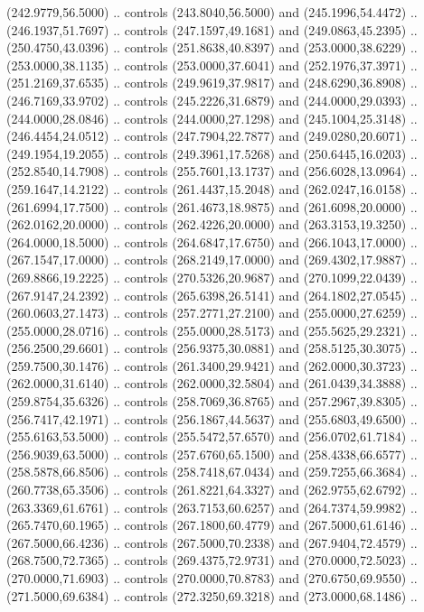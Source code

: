   (242.9779,56.5000) .. controls (243.8040,56.5000) and (245.1996,54.4472) ..
  (246.1937,51.7697) .. controls (247.1597,49.1681) and (249.0863,45.2395) ..
  (250.4750,43.0396) .. controls (251.8638,40.8397) and (253.0000,38.6229) ..
  (253.0000,38.1135) .. controls (253.0000,37.6041) and (252.1976,37.3971) ..
  (251.2169,37.6535) .. controls (249.9619,37.9817) and (248.6290,36.8908) ..
  (246.7169,33.9702) .. controls (245.2226,31.6879) and (244.0000,29.0393) ..
  (244.0000,28.0846) .. controls (244.0000,27.1298) and (245.1004,25.3148) ..
  (246.4454,24.0512) .. controls (247.7904,22.7877) and (249.0280,20.6071) ..
  (249.1954,19.2055) .. controls (249.3961,17.5268) and (250.6445,16.0203) ..
  (252.8540,14.7908) .. controls (255.7601,13.1737) and (256.6028,13.0964) ..
  (259.1647,14.2122) .. controls (261.4437,15.2048) and (262.0247,16.0158) ..
  (261.6994,17.7500) .. controls (261.4673,18.9875) and (261.6098,20.0000) ..
  (262.0162,20.0000) .. controls (262.4226,20.0000) and (263.3153,19.3250) ..
  (264.0000,18.5000) .. controls (264.6847,17.6750) and (266.1043,17.0000) ..
  (267.1547,17.0000) .. controls (268.2149,17.0000) and (269.4302,17.9887) ..
  (269.8866,19.2225) .. controls (270.5326,20.9687) and (270.1099,22.0439) ..
  (267.9147,24.2392) .. controls (265.6398,26.5141) and (264.1802,27.0545) ..
  (260.0603,27.1473) .. controls (257.2771,27.2100) and (255.0000,27.6259) ..
  (255.0000,28.0716) .. controls (255.0000,28.5173) and (255.5625,29.2321) ..
  (256.2500,29.6601) .. controls (256.9375,30.0881) and (258.5125,30.3075) ..
  (259.7500,30.1476) .. controls (261.3400,29.9421) and (262.0000,30.3723) ..
  (262.0000,31.6140) .. controls (262.0000,32.5804) and (261.0439,34.3888) ..
  (259.8754,35.6326) .. controls (258.7069,36.8765) and (257.2967,39.8305) ..
  (256.7417,42.1971) .. controls (256.1867,44.5637) and (255.6803,49.6500) ..
  (255.6163,53.5000) .. controls (255.5472,57.6570) and (256.0702,61.7184) ..
  (256.9039,63.5000) .. controls (257.6760,65.1500) and (258.4338,66.6577) ..
  (258.5878,66.8506) .. controls (258.7418,67.0434) and (259.7255,66.3684) ..
  (260.7738,65.3506) .. controls (261.8221,64.3327) and (262.9755,62.6792) ..
  (263.3369,61.6761) .. controls (263.7153,60.6257) and (264.7374,59.9982) ..
  (265.7470,60.1965) .. controls (267.1800,60.4779) and (267.5000,61.6146) ..
  (267.5000,66.4236) .. controls (267.5000,70.2338) and (267.9404,72.4579) ..
  (268.7500,72.7365) .. controls (269.4375,72.9731) and (270.0000,72.5023) ..
  (270.0000,71.6903) .. controls (270.0000,70.8783) and (270.6750,69.9550) ..
  (271.5000,69.6384) .. controls (272.3250,69.3218) and (273.0000,68.1486) ..
